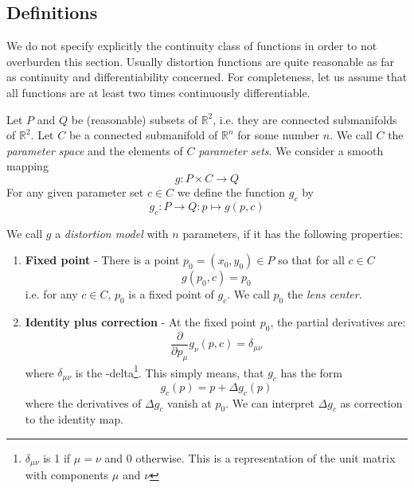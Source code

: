 \documentclass[10pt,a4paper]{article}
\newcommand{\Rpow}[1]{\mathbb{R}^{#1}}
\begin{document}
\subsection{Definitions}
We do not specify explicitly the continuity class of functions in order to not overburden this section.
Usually distortion functions are quite reasonable as far as continuity and differentiability concerned. 
For completeness, let us assume that all functions are at least two times continuously differentiable.
\begin{defn}
\label{def:DistortionModel}
Let $P$ and $Q$ be (reasonable) subsets of $\Rpow{2}$, i.e. they are connected submanifolds of $\Rpow{2}$.
Let $C$ be a connected submanifold of $\Rpow{n}$ for some number $n$. We call $C$ the {\em parameter
space} and the elements of $C$ {\em parameter sets}.
We consider a smooth mapping
\begin{equation}
g : P \times C \rightarrow Q
\end{equation}
For any given parameter set $c\in C$ we define the function $g_c$ by
\begin{equation}
g_c:P\rightarrow Q:p\mapsto g(p,c)
\end{equation}

We call $g$ a {\em distortion model} with $n$ parameters, if it has the following properties:\newline
\begin{enumerate}
\item {\bf Fixed point} - There is a point $p_0 = (x_0,y_0)\in P$ so that for all $c\in C$
\begin{equation}
g(p_0,c) = p_0
\end{equation}
i.e. for any $c\in C$, $p_0$ is a fixed point of $g_c$. We call $p_0$ the {\em lens center}.\newline

\item {\bf Identity plus correction} - At the fixed point $p_0$, the partial derivatives are:
\begin{equation}
\frac \partial {\partial p_\mu} g_\nu(p,c) = \delta_{\mu\nu}
\end{equation}
where $\delta_{\mu\nu}$ is the \Kronecker-delta\footnote{$\delta_{\mu\nu}$ is 1 if $\mu=\nu$ and 0
otherwise. This is a representation of the unit matrix with components $\mu$ and $\nu$}. This simply means, that
$g_c$ has the form
\begin{equation}
g_c(p) = p + \Delta g_c(p)
\end{equation}
where the derivatives of $\Delta g_c$ vanish at $p_0$. We can interpret $\Delta g_c$
as correction to the identity map.


\end{enumerate}
\end{defn}
\end{document}
